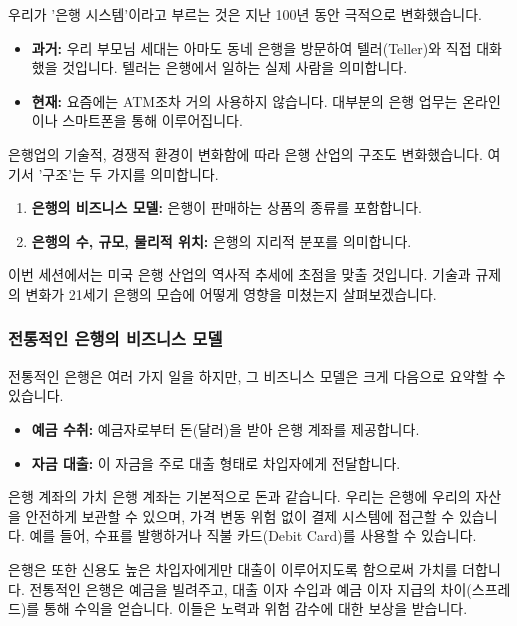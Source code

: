 \documentclass[11pt,a4paper]{article}
\begin{document}
우리가 '은행 시스템'이라고 부르는 것은 지난 100년 동안 극적으로 변화했습니다.

\begin{itemize}
    \item \textbf{과거:} 우리 부모님 세대는 아마도 동네 은행을 방문하여 텔러(Teller)와 직접 대화했을 것입니다. 텔러는 은행에서 일하는 실제 사람을 의미합니다.
    \item \textbf{현재:} 요즘에는 ATM조차 거의 사용하지 않습니다. 대부분의 은행 업무는 온라인이나 스마트폰을 통해 이루어집니다.
\end{itemize}

은행업의 기술적, 경쟁적 환경이 변화함에 따라 은행 산업의 구조도 변화했습니다. 여기서 '구조'는 두 가지를 의미합니다.
\begin{enumerate}
    \item \textbf{은행의 비즈니스 모델:} 은행이 판매하는 상품의 종류를 포함합니다.
    \item \textbf{은행의 수, 규모, 물리적 위치:} 은행의 지리적 분포를 의미합니다.
\end{enumerate}
이번 세션에서는 미국 은행 산업의 역사적 추세에 초점을 맞출 것입니다. 기술과 규제의 변화가 21세기 은행의 모습에 어떻게 영향을 미쳤는지 살펴보겠습니다.

\subsubsection*{전통적인 은행의 비즈니스 모델}
전통적인 은행은 여러 가지 일을 하지만, 그 비즈니스 모델은 크게 다음으로 요약할 수 있습니다.
\begin{itemize}
    \item \textbf{예금 수취:} 예금자로부터 돈(달러)을 받아 은행 계좌를 제공합니다.
    \item \textbf{자금 대출:} 이 자금을 주로 대출 형태로 차입자에게 전달합니다.
\end{itemize}

\begin{examplebox}{은행 계좌의 가치}
은행 계좌는 기본적으로 돈과 같습니다. 우리는 은행에 우리의 자산을 안전하게 보관할 수 있으며, 가격 변동 위험 없이 결제 시스템에 접근할 수 있습니다. 예를 들어, 수표를 발행하거나 직불 카드(Debit Card)를 사용할 수 있습니다.
\end{examplebox}

은행은 또한 신용도 높은 차입자에게만 대출이 이루어지도록 함으로써 가치를 더합니다. 전통적인 은행은 예금을 빌려주고, 대출 이자 수입과 예금 이자 지급의 차이(스프레드)를 통해 수익을 얻습니다. 이들은 노력과 위험 감수에 대한 보상을 받습니다.
\end{document}
